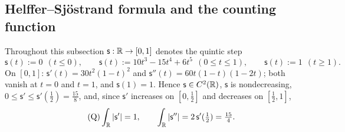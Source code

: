 \subsection{Helffer--Sj\"ostrand formula and the counting function}\label{sec:HS}
Throughout this subsection $\mathsf s:\mathbb{R}\to[0,1]$ denotes the quintic step
\[
 \mathsf s(t):=0\ \ (t\le0),\qquad \mathsf s(t):=10t^3-15t^4+6t^5\ \ (0\le t\le1),\qquad \mathsf s(t):=1\ \ (t\ge1).
\]
On $[0,1]$: $\mathsf s'(t)=30t^2(1-t)^2$ and $\mathsf s''(t)=60t(1-t)(1-2t)$; both vanish at $t=0$ and $t=1$, and $\mathsf s(1)=1$. Hence $\mathsf s\in C^2(\mathbb{R})$, $\mathsf s$ is nondecreasing, $0\le\mathsf s'\le\mathsf s'(\frac12)=\frac{15}8$,
and, since $\mathsf s'$ increases on $[0,\frac12]$ and decreases on $[\frac12,1]$,
\begin{equation}\tag{Q}\label{eq:a1-quintic}
 \int_{\mathbb{R}}|\mathsf s'|=1,\qquad\int_{\mathbb{R}}|\mathsf s''|=2\,\mathsf s'(\tfrac12)=\tfrac{15}4 .
\end{equation}

